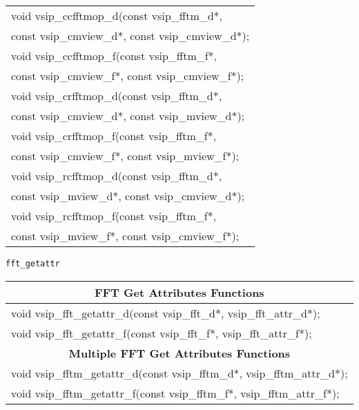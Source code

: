 {\begin{tabular}[H]{l}
void vsip\_ccfftmop\_d(const vsip\_fftm\_d*,\\*\hspace{.7cm} const vsip\_cmview\_d*, const vsip\_cmview\_d*);\\
void vsip\_ccfftmop\_f(const vsip\_fftm\_f*,\\*\hspace{.7cm} const vsip\_cmview\_f*, const vsip\_cmview\_f*);\\
void vsip\_crfftmop\_d(const vsip\_fftm\_d*,\\*\hspace{.7cm} const vsip\_cmview\_d*, const vsip\_mview\_d*);\\
void vsip\_crfftmop\_f(const vsip\_fftm\_f*,\\*\hspace{.7cm} const vsip\_cmview\_f*, const vsip\_mview\_f*);\\
void vsip\_rcfftmop\_d(const vsip\_fftm\_d*,\\*\hspace{.7cm} const vsip\_mview\_d*, const vsip\_cmview\_d*);\\
void vsip\_rcfftmop\_f(const vsip\_fftm\_f*,\\*\hspace{.7cm} const vsip\_mview\_f*, const vsip\_cmview\_f*);\\ \hline \end{tabular}
}
\clearpage
\hspace*{.8cm} \texttt{fft\_getattr}
\newline \hspace*{1.1cm} {
\ttfamily
\begin{tabular}[H]{l}\hline
\hline \multicolumn{1}{c}{\rmfamily \bfseries FFT Get Attributes Functions}\\ \hline
void vsip\_fft\_getattr\_d(const vsip\_fft\_d*, vsip\_fft\_attr\_d*);\\
void vsip\_fft\_getattr\_f(const vsip\_fft\_f*, vsip\_fft\_attr\_f*);\\
\hline \multicolumn{1}{c}{\rmfamily \bfseries Multiple FFT Get Attributes Functions}\\ \hline
void vsip\_fftm\_getattr\_d(const vsip\_fftm\_d*, vsip\_fftm\_attr\_d*);\\
void vsip\_fftm\_getattr\_f(const vsip\_fftm\_f*, vsip\_fftm\_attr\_f*);\\
\end{tabular}
}
\pyjvsiph
